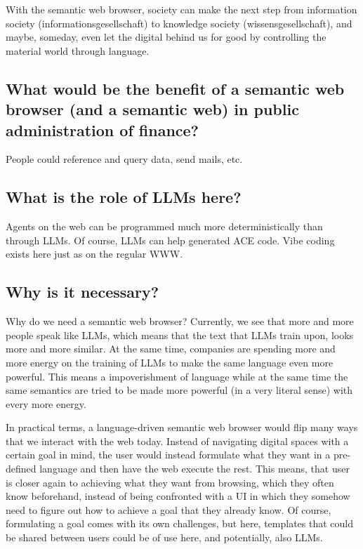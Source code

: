 \documentclass[12pt,a4paper]{article}
\begin{document}
With the semantic web browser, society can make the next step from information society (informationsgesellschaft) to knowledge society (wissensgesellschaft), and maybe, someday, even let the digital behind us for good by controlling the material world through language.

\subsection{What would be the benefit of a semantic web browser (and a semantic web) in public administration of finance?}

People could reference and query data, send mails, etc.

\subsection{What is the role of LLMs here?}

Agents on the web can be programmed much more deterministically than through LLMs. Of course, LLMs can help generated ACE code. Vibe coding exists here just as on the regular WWW.

\subsection{Why is it necessary?}

Why do we need a semantic web browser? Currently, we see that more and more people speak like LLMs, which means that the text that LLMs train upon, looks more and more similar. At the same time, companies are spending more and more energy on the training of LLMs to make the same language even more powerful. This means a impoverishment of language while at the same time the same semantics are tried to be made more powerful (in a very literal sense) with every more energy.

In practical terms, a language-driven semantic web browser would flip many ways that we interact with the web today. Instead of navigating digital spaces with a certain goal in mind, the user would instead formulate what they want in a pre-defined language and then have the web execute the rest. This means, that user is closer again to achieving what they want from browsing, which they often know beforehand, instead of being confronted with a UI in which they somehow need to figure out how to achieve a goal that they already know. Of course, formulating a goal comes with its own challenges, but here, templates that could be shared between users could be of use here, and potentially, also LLMs.
\end{document}
